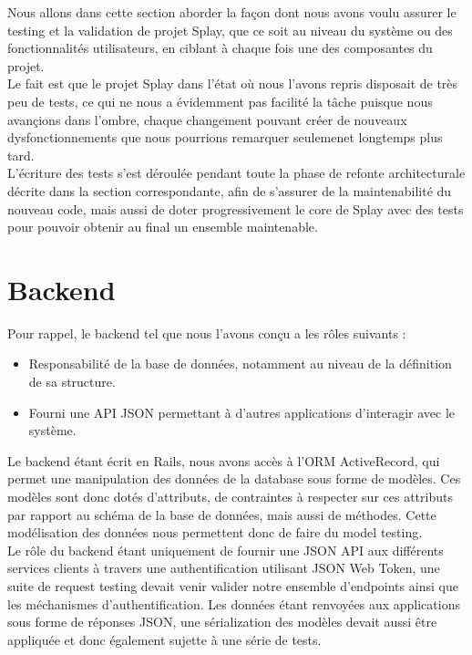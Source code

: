 \documentclass{eplmastersthesis}
\begin{document}
    Nous allons dans cette section aborder la façon dont nous avons voulu assurer
    le testing et la validation de projet Splay, que ce soit au niveau du système
    ou des fonctionnalités utilisateurs, en ciblant à chaque fois une des
    composantes du projet.\\

    Le fait est que le projet Splay dans l'état où nous l'avons repris disposait
    de très peu de tests, ce qui ne nous a évidemment pas facilité la tâche puisque
    nous avançions dans l'ombre, chaque changement pouvant créer de nouveaux
    dysfonctionnements que nous pourrions remarquer seulemenet longtemps plus tard.\\

    L'écriture des tests s'est déroulée pendant toute la phase de refonte
    architecturale décrite dans la section correspondante, afin de s'assurer
    de la maintenabilité du nouveau code, mais aussi de doter progressivement
    le core de Splay avec des tests pour pouvoir obtenir au final un ensemble
    maintenable.\\


    \section{Backend}

      Pour rappel, le backend tel que nous l'avons conçu a les rôles suivants :
      \begin{itemize}
        \item Responsabilité de la base de données, notamment au niveau de
        la définition de sa structure.
        \item Fourni une API JSON permettant à d'autres applications d'interagir
        avec le système.
      \end{itemize}

      Le backend étant écrit en Rails, nous avons accès à l'ORM ActiveRecord, qui
      permet une manipulation des données de la database sous forme de modèles.
      Ces modèles sont donc dotés d'attributs, de contraintes à respecter sur
      ces attributs par rapport au schéma de la base de données, mais aussi de
      méthodes. Cette modélisation des données nous permettent donc de faire
      du model testing.\\

      Le rôle du backend étant uniquement de fournir une JSON API
      aux différents services clients à travers une authentification utilisant
      JSON Web Token, une suite de request testing devait venir valider
      notre ensemble d'endpoints ainsi que les méchanismes d'authentification.
      Les données étant renvoyées aux applications sous forme de réponses
      JSON, une sérialization des modèles devait aussi être appliquée et donc
      également sujette à une série de tests.
\end{document}
